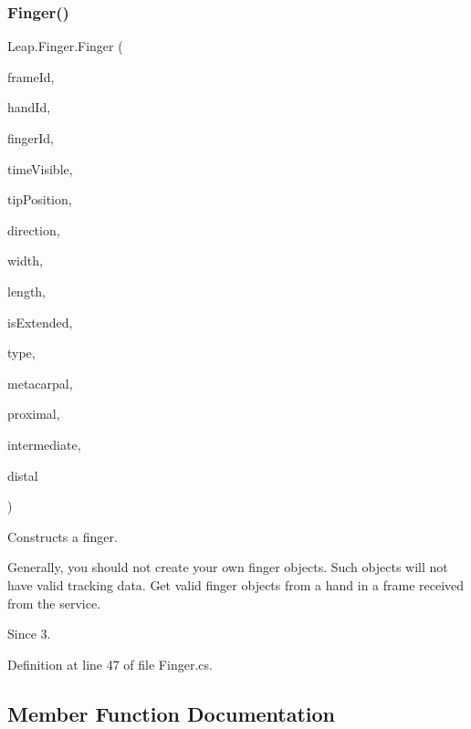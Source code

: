\subsubsection{\texorpdfstring{Finger()}{Finger()}\hspace{0.1cm}{\footnotesize\ttfamily [2/2]}}
{\footnotesize\ttfamily Leap.\+Finger.\+Finger (\begin{DoxyParamCaption}\item[{long}]{frame\+Id,  }\item[{int}]{hand\+Id,  }\item[{int}]{finger\+Id,  }\item[{float}]{time\+Visible,  }\item[{\mbox{\hyperlink{struct_leap_1_1_vector}{Vector}}}]{tip\+Position,  }\item[{\mbox{\hyperlink{struct_leap_1_1_vector}{Vector}}}]{direction,  }\item[{float}]{width,  }\item[{float}]{length,  }\item[{bool}]{is\+Extended,  }\item[{\mbox{\hyperlink{class_leap_1_1_finger_ae75e8d46a01aff0bd5c6d6fb99e2f2ba}{Finger\+Type}}}]{type,  }\item[{\mbox{\hyperlink{class_leap_1_1_bone}{Bone}}}]{metacarpal,  }\item[{\mbox{\hyperlink{class_leap_1_1_bone}{Bone}}}]{proximal,  }\item[{\mbox{\hyperlink{class_leap_1_1_bone}{Bone}}}]{intermediate,  }\item[{\mbox{\hyperlink{class_leap_1_1_bone}{Bone}}}]{distal }\end{DoxyParamCaption})}



Constructs a finger. 

Generally, you should not create your own finger objects. Such objects will not have valid tracking data. Get valid finger objects from a hand in a frame received from the service. \begin{DoxySince}{Since}
3. 
\end{DoxySince}


Definition at line 47 of file Finger.\+cs.



\subsection{Member Function Documentation}
\mbox{\label{class_leap_1_1_finger_a5ae2d74471ca480d76820478067bda64}} 
